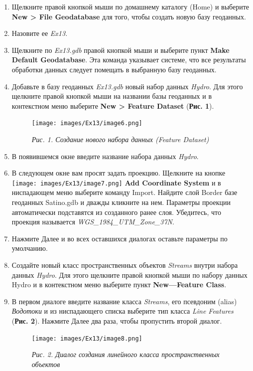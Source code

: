\documentclass[12pt,]{book}
\begin{document}
\begin{enumerate}
\def\labelenumi{\arabic{enumi}.}
\item
  Щелкните правой кнопкой мыши по домашнему каталогу (Home) и выберите \textbf{New \textgreater{} File Geodatabase} для того, чтобы создать новую базу геоданных.
\item
  Назовите ее \emph{Ex13.}
\item
  Щелкните по \emph{Ex13.gdb} правой кнопкой мыши и выберите пункт \textbf{Make Default Geodatabase}. Эта команда указывает системе, что все результаты обработки данных следует помещать в выбранную базу геоданных.
\item
  Добавьте в базу геоданных \emph{Ex13.gdb} новый набор данных \emph{Hydro}. Для этого щелкните правой кнопкой мыши на названии базы геоданных и в контекстном меню выберите \textbf{New \textgreater{} Feature Dataset} (\textbf{Рис. 1}).

  \begin{figure}
  \centering
  \texttt{[image: images/Ex13/image6.png]}
  \caption{\emph{Рис. 1. Создание нового набора данных (Feature Dataset)}}
  \end{figure}
\item
  В появившемся окне введите название набора данных \emph{Hydro}.
\item
  В следующем окне вам просят задать проекцию. Щелкните на кнопке \texttt{[image: images/Ex13/image7.png]} \textbf{Add Coordinate System} и в ниспадающем меню выберите команду Import. Найдите слой Border базе геоданных Satino.gdb и дважды кликните на нем. Параметры проекции автоматически подставятся из созданного ранее слоя. Убедитесь, что проекция называется \emph{WGS\_1984\_UTM\_Zone\_37N}.
\item
  Нажмите Далее и во всех оставшихся диалогах оставьте параметры по умолчанию.
\item
  Создайте новый класс пространственных объектов \emph{Streams} внутри набора данных \emph{Hydro}. Для этого щелкните правой кнопкой мыши по набору данных Hydro и в контекстном меню выберите пункт \textbf{New---Feature Class}.
\item
  В первом диалоге введите название класса \emph{Streams}, его псевдоним (alias) \emph{Водотоки} и из ниспадающего списка выберите тип класса \emph{Line Features} (\textbf{Рис. 2}). Нажмите Далее два раза, чтобы пропустить второй диалог.

  \begin{figure}
  \centering
  \texttt{[image: images/Ex13/image8.png]}
  \caption{\emph{Рис. 2. Диалог создания линейного класса пространственных объектов}}
  \end{figure}


\end{enumerate}
\end{document}
